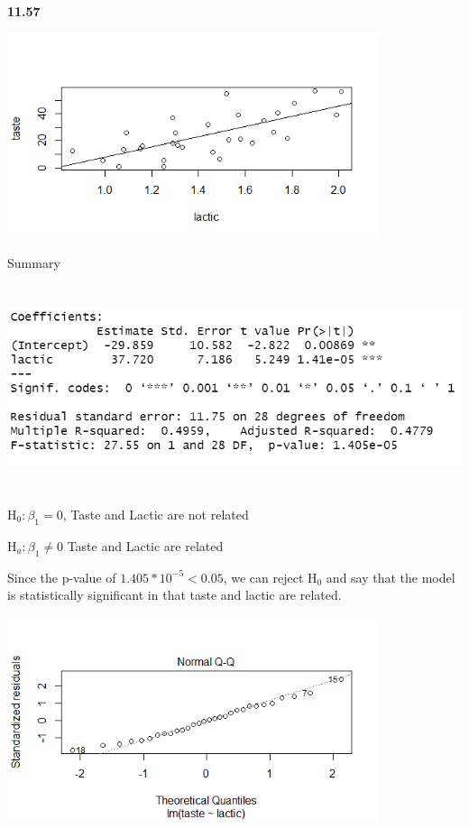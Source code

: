 \documentclass[12pt]{article}
\renewcommand\part[1]{\vspace{.10in}\textbf{#1}\par}
\begin{document}
\part{11.57}
	\begin{center}
	\includegraphics[width=.5\textwidth, height=60mm, keepaspectratio]{images/1157/taste_lactic_linear_regression.png}\par

	Summary\par
	\includegraphics[width=.5\textwidth, height=60mm, keepaspectratio]{images/1157/lactic_taste_summary.PNG}\par
	H$_{0}: \beta_{1} = 0$, Taste and Lactic are not related\par
	H$_{a}: \beta_{1} \ne 0$ Taste and Lactic are related\par
	Since the p-value of $1.405*10^{-5} < 0.05$, we can reject H$_{0}$ and say that the model is statistically significant in that taste and lactic are related.\par
	
	\includegraphics[width=.5\textwidth, height=60mm, keepaspectratio]{images/1157/1157qq.png}\par
	

\end{center}
\end{document}
